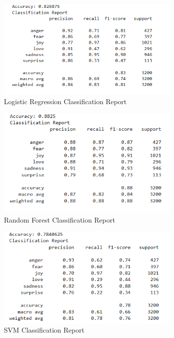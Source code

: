 \begin{figure}[h!]
	\centering
	\includegraphics[width=0.8\textwidth]{init_result_logistic_regression.png}
	\caption{Logistic Regression Classification Report}
	\label{fig:initial_logistic_regression}
\end{figure}

\begin{figure}[h!]
	\centering
	\includegraphics[width=0.8\textwidth]{init_result_random_forest.png}
	\caption{Random Forest Classification Report}
	\label{fig:initial_random_forest}
\end{figure}

\begin{figure}[h!]
	\centering
	\includegraphics[width=0.8\textwidth]{init_result_svm.png}
	\caption{SVM Classification Report}
	\label{fig:initial_svm}
\end{figure}


